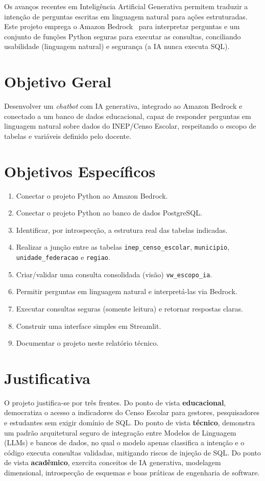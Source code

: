 \documentclass[
    12pt,
    oneside,
    a4paper,
    chapter=TITLE,
    section=TITLE
]{abntex2}
\begin{document}
Os avanços recentes em Inteligência Artificial Generativa permitem traduzir a intenção de perguntas
escritas em linguagem natural para ações estruturadas. Este projeto emprega o Amazon
Bedrock~\cite{aws_bedrock} para interpretar perguntas e um conjunto de funções Python seguras para
executar as consultas, conciliando usabilidade (linguagem natural) e segurança (a IA nunca executa
SQL).

\section{Objetivo Geral}
Desenvolver um \textit{chatbot} com IA generativa, integrado ao Amazon Bedrock e conectado a um
banco de dados educacional, capaz de responder perguntas em linguagem natural sobre dados do
INEP/Censo Escolar, respeitando o escopo de tabelas e variáveis definido pelo docente.

\section{Objetivos Específicos}
\begin{enumerate}[itemsep=2pt]
  \item Conectar o projeto Python ao Amazon Bedrock.
  \item Conectar o projeto Python ao banco de dados PostgreSQL.
  \item Identificar, por introspecção, a estrutura real das tabelas indicadas.
  \item Realizar a junção entre as tabelas \texttt{inep\_censo\_escolar}, \texttt{municipio},
        \texttt{unidade\_federacao} e \texttt{regiao}.
  \item Criar/validar uma consulta consolidada (visão) \texttt{vw\_escopo\_ia}.
  \item Permitir perguntas em linguagem natural e interpretá-las via Bedrock.
  \item Executar consultas seguras (somente leitura) e retornar respostas claras.
  \item Construir uma interface simples em Streamlit.
  \item Documentar o projeto neste relatório técnico.
\end{enumerate}

\section{Justificativa}
O projeto justifica-se por três frentes. Do ponto de vista \textbf{educacional}, democratiza o
acesso a indicadores do Censo Escolar para gestores, pesquisadores e estudantes sem exigir domínio
de SQL. Do ponto de vista \textbf{técnico}, demonstra um padrão arquitetural seguro de integração
entre Modelos de Linguagem (LLMs) e bancos de dados, no qual o modelo apenas classifica a intenção e
o código executa consultas validadas, mitigando riscos de injeção de SQL. Do ponto de vista
\textbf{acadêmico}, exercita conceitos de IA generativa, modelagem dimensional, introspecção de
esquemas e boas práticas de engenharia de software.
\end{document}
